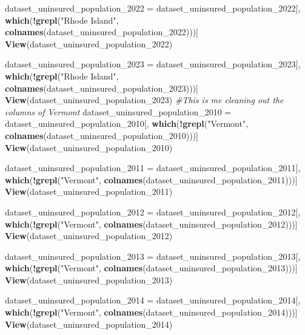 \documentclass[
]{article}
\newenvironment{Shaded}{\begin{snugshade}}{\end{snugshade}}
\newcommand{\CommentTok}[1]{\textcolor[rgb]{0.56,0.35,0.01}{\textit{#1}}}
\newcommand{\FunctionTok}[1]{\textcolor[rgb]{0.13,0.29,0.53}{\textbf{#1}}}
\newcommand{\NormalTok}[1]{#1}
\newcommand{\OtherTok}[1]{\textcolor[rgb]{0.56,0.35,0.01}{#1}}
\newcommand{\SpecialCharTok}[1]{\textcolor[rgb]{0.81,0.36,0.00}{\textbf{#1}}}
\newcommand{\StringTok}[1]{\textcolor[rgb]{0.31,0.60,0.02}{#1}}
\begin{document}
\begin{Shaded}
\begin{Highlighting}[]
\NormalTok{dataset\_uninsured\_population\_2022 }\OtherTok{=}\NormalTok{ dataset\_uninsured\_population\_2022[, }\FunctionTok{which}\NormalTok{(}\SpecialCharTok{!}\FunctionTok{grepl}\NormalTok{(}\StringTok{"Rhode Island"}\NormalTok{, }\FunctionTok{colnames}\NormalTok{(dataset\_uninsured\_population\_2022)))]}
\FunctionTok{View}\NormalTok{(dataset\_uninsured\_population\_2022)}

\NormalTok{dataset\_uninsured\_population\_2023 }\OtherTok{=}\NormalTok{ dataset\_uninsured\_population\_2023[, }\FunctionTok{which}\NormalTok{(}\SpecialCharTok{!}\FunctionTok{grepl}\NormalTok{(}\StringTok{"Rhode Island"}\NormalTok{, }\FunctionTok{colnames}\NormalTok{(dataset\_uninsured\_population\_2023)))]}
\FunctionTok{View}\NormalTok{(dataset\_uninsured\_population\_2023)}
\CommentTok{\#This is me cleaning out the columns of Vermont}
\NormalTok{dataset\_uninsured\_population\_2010 }\OtherTok{=}\NormalTok{ dataset\_uninsured\_population\_2010[, }\FunctionTok{which}\NormalTok{(}\SpecialCharTok{!}\FunctionTok{grepl}\NormalTok{(}\StringTok{"Vermont"}\NormalTok{, }\FunctionTok{colnames}\NormalTok{(dataset\_uninsured\_population\_2010)))]}
\FunctionTok{View}\NormalTok{(dataset\_uninsured\_population\_2010)}

\NormalTok{dataset\_uninsured\_population\_2011 }\OtherTok{=}\NormalTok{ dataset\_uninsured\_population\_2011[, }\FunctionTok{which}\NormalTok{(}\SpecialCharTok{!}\FunctionTok{grepl}\NormalTok{(}\StringTok{"Vermont"}\NormalTok{, }\FunctionTok{colnames}\NormalTok{(dataset\_uninsured\_population\_2011)))]}
\FunctionTok{View}\NormalTok{(dataset\_uninsured\_population\_2011)}

\NormalTok{dataset\_uninsured\_population\_2012 }\OtherTok{=}\NormalTok{ dataset\_uninsured\_population\_2012[, }\FunctionTok{which}\NormalTok{(}\SpecialCharTok{!}\FunctionTok{grepl}\NormalTok{(}\StringTok{"Vermont"}\NormalTok{, }\FunctionTok{colnames}\NormalTok{(dataset\_uninsured\_population\_2012)))]}
\FunctionTok{View}\NormalTok{(dataset\_uninsured\_population\_2012)}

\NormalTok{dataset\_uninsured\_population\_2013 }\OtherTok{=}\NormalTok{ dataset\_uninsured\_population\_2013[, }\FunctionTok{which}\NormalTok{(}\SpecialCharTok{!}\FunctionTok{grepl}\NormalTok{(}\StringTok{"Vermont"}\NormalTok{, }\FunctionTok{colnames}\NormalTok{(dataset\_uninsured\_population\_2013)))]}
\FunctionTok{View}\NormalTok{(dataset\_uninsured\_population\_2013)}

\NormalTok{dataset\_uninsured\_population\_2014 }\OtherTok{=}\NormalTok{ dataset\_uninsured\_population\_2014[, }\FunctionTok{which}\NormalTok{(}\SpecialCharTok{!}\FunctionTok{grepl}\NormalTok{(}\StringTok{"Vermont"}\NormalTok{, }\FunctionTok{colnames}\NormalTok{(dataset\_uninsured\_population\_2014)))]}
\FunctionTok{View}\NormalTok{(dataset\_uninsured\_population\_2014)}


\end{Highlighting}
\end{Shaded}
\end{document}
